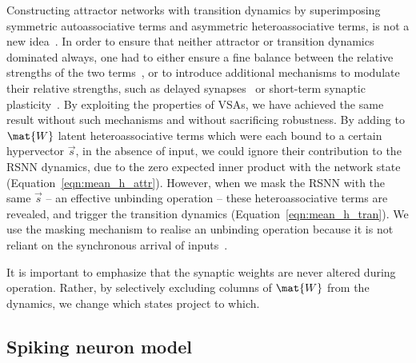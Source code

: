 Constructing attractor networks with transition dynamics by superimposing symmetric autoassociative terms and asymmetric heteroassociative terms, is not a new idea~\cite{horn_neural_1989}. In order to ensure that neither attractor or transition dynamics dominated always, one had to either ensure a fine balance between the relative strengths of the two terms~\cite{sommer_synfire_2005, kambara_role_1997, buhmann_noise-driven_1987}, or to introduce additional mechanisms to modulate their relative strengths, such as delayed synapses~\cite{gutfreund_processing_1988, amit_neural_1988, drossaers_hopfield_1992, kleinfeld_sequential_1986} or short-term synaptic plasticity~\cite{chen_attractor-state_2020, peretto_collective_1986}. By exploiting the properties of VSAs, we have achieved the same result without such mechanisms and without sacrificing robustness. By adding to $\mat{W}$ latent heteroassociative terms which were each bound to a certain hypervector $\vec{s}$, in the absence of input, we could ignore their contribution to the RSNN dynamics, due to the zero expected inner product with the network state \mbox{(Equation \ref{eqn:mean_h_attr})}. However, when we mask the RSNN with the same $\vec{s}$ -- an effective unbinding operation -- these heteroassociative terms are revealed, and trigger the transition dynamics \mbox{(Equation \ref{eqn:mean_h_tran})}. We use the masking mechanism to realise an unbinding operation because it is not reliant on the synchronous arrival of inputs~\cite{cotteret_vector_2024}.

It is important to emphasize that the synaptic weights are never altered during operation. Rather, by selectively excluding columns of $\mat{W}$ from the dynamics, we change which states project to which.

\subsection{Spiking neuron model}

